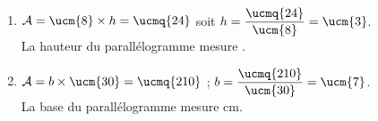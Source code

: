    \ \\ [-5mm]
   \begin{enumerate}
      \item $\mathcal{A} =\ucm{8}\times h =\ucmq{24}$ soit $h =\dfrac{\ucmq{24}}{\ucm{8}} =\ucm{3}$. \\ [1mm]
         La {\blue hauteur} du parallélogramme mesure {\blue {}}. \smallskip
      \item $\mathcal{A} =b\times\ucm{30} =\ucmq{210}$ ; $b =\dfrac{\ucmq{210}}{\ucm{30}} =\ucm{7}$. \\ [1mm]
      La {\blue base} du parallélogramme mesure { cm}.
   \end{enumerate}
